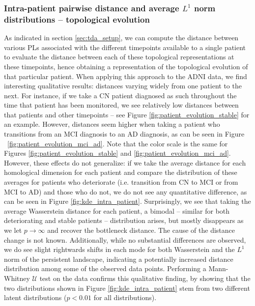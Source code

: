 \documentclass{article}
\begin{document}
\subsubsection{Intra-patient pairwise distance and average $L^1$ norm distributions -- topological
  evolution}

As indicated in section \ref{sec:tda_setup}, we can compute the distance between various PLs
associated with the different timepoints available to a single patient to evaluate the distance
between each of these topological representations at these timepoints, hence obtaining a
representation of the topological evolution of that particular patient. When applying this approach
to the ADNI data, we find interesting qualitative results: distances varying widely from one patient to
the next. For instance, if we take a CN patient diagnosed as such throughout the time that patient
has been monitored, we see relatively low distances between that patients and other timepoints --
see Figure \ref{fig:patient_evolution_stable} for an example. However, distances seem higher when
taking a patient who transitions from an MCI diagnosis to an AD diagnosis, as can be seen in Figure
~\ref{fig:patient_evolution_mci_ad}. Note that the color scale is the same for Figures
\ref{fig:patient_evolution_stable} and \ref{fig:patient_evolution_mci_ad}. However, these effects do
not generalize: if we take the average distance for each homological dimension for each patient and
compare the distribution of these averages for patients who deteriorate (i.e. transition from CN to
MCI or from MCI to AD) and those who do not, we do not see any quantitative difference, as can be
seen in Figure \ref{fig:kde_intra_patient}. Surprisingly, we see that taking the average Wasserstein
distance for each patient, a bimodal -- similar for both deteriorating and stable patients --
distribution arises, but mostly disappears as we let $p\to\infty$ and recover the bottleneck
distance. The cause of the distance change is not known. Additionally, while no substantial
differences are observed, we do see slight rightwards shifts in each mode for both Wasserstein and
the $L^1$ norm of the persistent landscape, indicating a potentially increased distance distribution
among some of the observed data points. Performing a Mann-Whitney $\mathcal{U}$ test on the data
confirms this qualitative finding, by showing that the two distributions shown in Figure
\ref{fig:kde_intra_patient} stem from two different latent distributions ($p<0.01$ for all
distributions).
\end{document}
